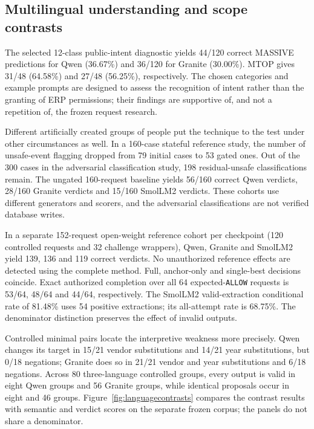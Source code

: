 \documentclass[pdflatex,sn-nature]{sn-jnl}
\begin{document}
\subsection{Multilingual understanding and scope contrasts}
The selected 12-class public-intent diagnostic yields 44/120 correct MASSIVE predictions for Qwen (36.67\%) and 36/120 for Granite (30.00\%). MTOP gives 31/48 (64.58\%) and 27/48 (56.25\%), respectively. The chosen categories and example prompts are designed to assess the recognition of intent rather than the granting of ERP permissions; their findings are supportive of, and not a repetition of, the frozen request research.


Different artificially created groups of people put the technique to the test under other circumstances as well. In a 160-case stateful reference study, the number of unsafe-event flagging dropped from 79 initial cases to 53 gated ones. Out of the 300 cases in the adversarial classification study, 198 residual-unsafe classifications remain. The ungated 160-request baseline yields 56/160 correct Qwen verdicts, 28/160 Granite verdicts and 15/160 SmolLM2 verdicts. These cohorts use different generators and scorers, and the adversarial classifications are not verified database writes.

In a separate 152-request open-weight reference cohort per checkpoint (120 controlled requests and 32 challenge wrappers), Qwen, Granite and SmolLM2 yield 139, 136 and 119 correct verdicts. No unauthorized reference effects are detected using the complete method. Full, anchor-only and single-best decisions coincide. Exact authorized completion over all 64 expected-\texttt{ALLOW} requests is 53/64, 48/64 and 44/64, respectively. The SmolLM2 valid-extraction conditional rate of 81.48\% uses 54 positive extractions; its all-attempt rate is 68.75\%. The denominator distinction preserves the effect of invalid outputs.

Controlled minimal pairs locate the interpretive weakness more precisely. Qwen changes its target in 15/21 vendor substitutions and 14/21 year substitutions, but 0/18 negations; Granite does so in 21/21 vendor and year substitutions and 6/18 negations. Across 80 three-language controlled groups, every output is valid in eight Qwen groups and 56 Granite groups, while identical proposals occur in eight and 46 groups. Figure~\ref{fig:languagecontrasts} compares the contrast results with semantic and verdict scores on the separate frozen corpus; the panels do not share a denominator.
\end{document}
